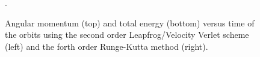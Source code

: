 \documentclass{article}
\begin{document}
\begin{figure}[h!]%
    \centering
    \qquad
    \qquad
    \qquad
    \caption[]{Angular momentum (top) and total energy (bottom) versus time of
    the orbits using the second order Leapfrog/Velocity Verlet scheme (left) and
    the forth order Runge-Kutta method (right).}.
\end{figure}
\end{document}

